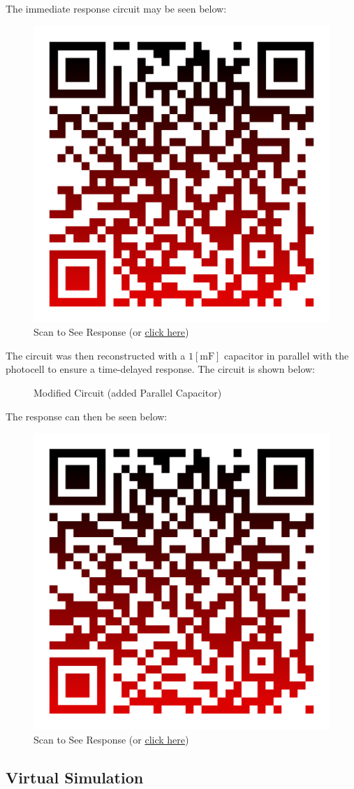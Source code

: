 \documentclass[
	letterpaper, %
	10pt, %
]{CSUniSchoolLabReport}
\begin{document}
The immediate response circuit may be seen below:

\begin{figure}[H]
  \centering
  \includegraphics[width=.4\textwidth]{Figures/L3Q1}
  \caption{Scan to See Response (or \href{http://Michael.Brodskiy.com/NightLight1.mp4}{click here})}
  \label{fig:4}
\end{figure}

The circuit was then reconstructed with a $1[\si{\milli\farad}]$ capacitor in parallel with the photocell to ensure a time-delayed response. The circuit is shown below:

\begin{figure}[H]
  \centering
  
  \caption{Modified Circuit (added Parallel Capacitor)}
  \label{fig:5}
\end{figure}

The response can then be seen below:

\begin{figure}[H]
  \centering
  \includegraphics[width=.4\textwidth]{Figures/L3Q2}
  \caption{Scan to See Response (or \href{http://Michael.Brodskiy.com/NightLight2.mp4}{click here})}
  \label{fig:6}
\end{figure}

\subsection{Virtual Simulation}
\end{document}
